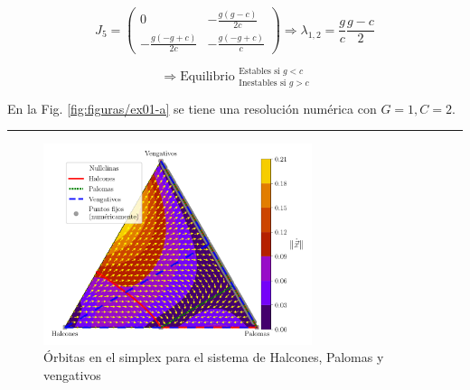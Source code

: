 \documentclass[twocolumn,aps,prl]{revtex4-1}
\newcommand*\sepline{%
  \begin{center}
    \rule[1ex]{.5\textwidth}{.5pt}
  \end{center}}
\begin{document}

$$J_5 =
\begin{pmatrix}
    0
    &
    -\frac{g\left(g-c\right)}{2c}
    \\  
    -\frac{g\left(-g+c\right)}{2c}
    &
    -\frac{g\left(-g+c\right)}{c}
\end{pmatrix}
\Rightarrow  \lambda_{1,2} = \frac{g}{c} \frac{g-c}{2}
$$

$$
\Rightarrow \text{Equilibrio }  ^{\text{Estables si } g<c}_{\text{Inestables si } g>c}
$$

En la Fig. \ref{fig:figuras/ex01-a} se tiene una resolución numérica con $G=1, C=2$.



\sepline

\begin{figure}[ht!]
    \centering
        \includegraphics[width = 0.7\textwidth]{figuras/ex01-b.pdf}
    \caption{Órbitas en el simplex para el sistema de Halcones, Palomas y vengativos}
    \label{fig:figuras/ex01-b}
\end{figure}
\end{document}
